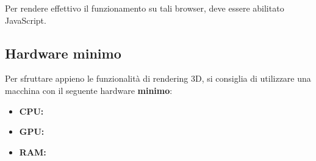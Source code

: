 Per rendere effettivo il funzionamento su tali browser, deve essere abilitato JavaScript.

\subsection{Hardware minimo}
Per sfruttare appieno le funzionalità di rendering 3D, si consiglia di utilizzare una macchina con il seguente hardware \textbf{minimo}:
\begin{itemize}
    \item \textbf{CPU:}
    \item \textbf{GPU:}
    \item \textbf{RAM:}
\end{itemize}
